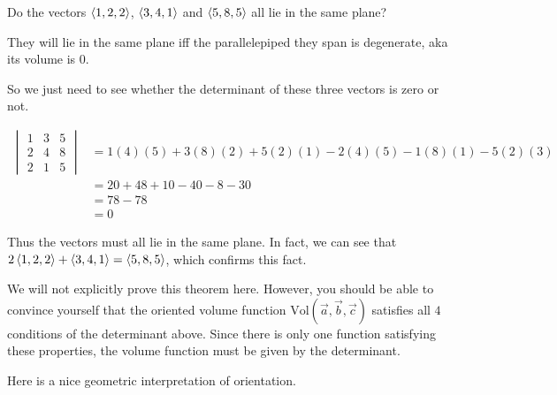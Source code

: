 \documentclass{ximera}
\begin{document}
	\begin{question}
		Do the vectors $\left\langle 1,2,2\right\rangle$, $\left\langle 3,4,1\right\rangle$ and $\left\langle 5,8,5\right\rangle$ all lie in the same plane?
		
		\begin{multipleChoice}
		\end{multipleChoice}
		
		\begin{hint}
			They will lie in the same plane iff the parallelepiped they span is degenerate, aka its volume is $0$.
		\end{hint}
		
		\begin{hint}
			So we just need to see whether the determinant of these three vectors is zero or not.
		\end{hint}
		
		\begin{hint}
			\begin{align*}
				\begin{vmatrix}
				1&3&5\\
				2&4&8\\
				2&1&5
				\end{vmatrix} &= 1(4)(5)+3(8)(2)+5(2)(1)-2(4)(5)-1(8)(1)-5(2)(3)\\
					&=20+48+10-40-8-30\\
					&=78-78\\
					&=0
			\end{align*}
			
			Thus the vectors must all lie in the same plane.  In fact, we can see that $2\left\langle 1,2,2\right\rangle+\left\langle 3,4,1\right\rangle=\left\langle 5,8,5\right\rangle$, which confirms this fact.
		\end{hint}
		
 	\end{question}
	

	
	We will not explicitly prove this theorem here.  However, you should be able to convince yourself that the oriented volume function $\textrm{Vol}(\vec{a},\vec{b},\vec{c})$ satisfies all $4$ conditions of the determinant above.  Since there is only one function satisfying these properties, the volume function must be given by the determinant.
	
	Here is a nice geometric interpretation of orientation.
	
\end{document}
